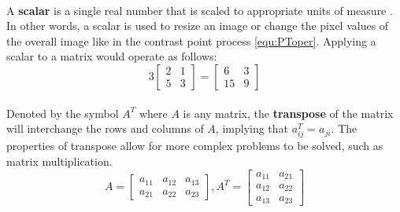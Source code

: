 \documentclass[11pt]{article}
\begin{document}
\paragraph[Scalars]{} A \textbf{scalar} is a single real number that is scaled to appropriate units of measure \cite{larson_calculus_2014}. In other words, a scalar is used to resize an image or change the pixel values of the overall image like in the contrast point process \eqref{equ:PToper}. Applying a scalar to a matrix would operate as follows:
{ \small
	\begin{equation}\label{equ:ScalarMultiplication}
	3
	\begin{bmatrix}
	2 & 1 \\
	5 & 3
	\end{bmatrix}
	=	
	\begin{bmatrix}
	6  & 3 \\
	15 & 9
	\end{bmatrix}
	\end{equation}
}
\paragraph[Transpose]{} Denoted by the symbol $A^{T}$ where $A$ is any matrix, the \textbf{transpose} of the matrix will interchange the rows and columns of $A$, implying that $a^{T}_{ij}=a_{ji}$. The properties of transpose allow for more complex problems to be solved, such as matrix multiplication.
{ \small
	\begin{equation}\label{equ:Transpose}
	A =
	\begin{bmatrix}
	a_{11} & a_{12} & a_{13}\\
	a_{21} & a_{22} & a_{23}
	\end{bmatrix}
	,
	A^{T}=
	\begin{bmatrix}
	a_{11} & a_{21} \\
	a_{12} & a_{22} \\
	a_{13} & a_{23}
	\end{bmatrix}
	\end{equation}
}
\end{document}
